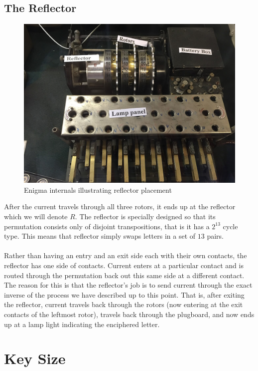 \subsection{The Reflector}
\begin{figure}[H]
  \begin{center}\includegraphics[scale=0.3]{paper/images/internals.jpg}
  \end{center}
  \label{ref:internals}
  \caption{Enigma internals illustrating reflector placement}
\end{figure}
\noindent After the current travels through all three rotors, it ends up at the
reflector which we will denote $R$. The reflector is specially
designed so that its permutation consists only of disjoint
transpositions, that is it has a $2^{13}$ cycle type. This means that
reflector simply swaps letters in a set of $13$ pairs.
\\\\Rather than having an entry and an exit side each with their own
contacts, the reflector has one side of contacts. Current enters at a
particular contact and is routed through the permutation back out
this same side at a different contact. The reason for this is that
the reflector's job is to send current through the exact inverse of
the process we have described up to this point. That is, after
exiting the reflector, current travels back through the rotors (now
entering at the exit contacts of the leftmost rotor), travels back
through the plugboard, and now ends up at a lamp light indicating the
enciphered letter.

\section{Key Size}

